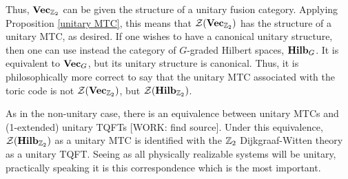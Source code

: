 \documentclass{article}
\theoremstyle{definition}
\numberwithin{figure}{section}
\begin{document}
Thus, $\bold{Vec}_{\mathbb{Z}_2}$ can be given the structure of a unitary fusion category. Applying Proposition \ref{unitary MTC}, this means that $\mathcal{Z}(\bold{Vec}_{\mathbb{Z}_2})$ has the structure of a unitary MTC, as desired. If one wishes to have a canonical unitary structure, then one can use instead the category of $G$-graded Hilbert spaces, $\bold{Hilb}_G$. It is equivalent to $\bold{Vec}_G$, but its unitary structure is canonical. Thus, it is philosophically more correct to say that the unitary MTC associated with the toric code is not $\mathcal{Z}(\bold{Vec}_{\mathbb{Z}_2})$, but $\mathcal{Z}(\bold{Hilb}_{\mathbb{Z}_2})$.

As in the non-unitary case, there is an equivalence between unitary MTCs and (1-extended) unitary TQFTs [WORK: find source]. Under this equivalence, $\mathcal{Z}(\bold{Hilb}_{\mathbb{Z}_2})$ as a unitary MTC is identified with the $\mathbb{Z}_2$ Dijkgraaf-Witten theory as a unitary TQFT. Seeing as all physically realizable systems will be unitary, practically speaking it is this correspondence which is the most important.



\end{document}
